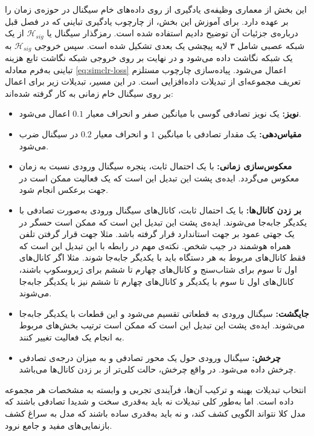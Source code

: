 این بخش از معماری وظیفه‌ی یادگیری از روی داده‌های خام سیگنال در حوزه‌ی زمان را بر عهده دارد. برای آموزش این بخش، از چارچوب یادگیری تباینی
که در فصل قبل درباره‌ی جزئیات آن توضیح دادیم استفاده شده است. رمزگذار سیگنال یا
$\mathcal{H}_{sig}$
از یک شبکه عصبی شامل ۳ لایه پیچشی یک بعدی تشکیل شده است. سپس خروجی $\mathcal{H}_{sig}$
به یک شبکه نگاشت داده می‌شود و در نهایت بر روی خروجی شبکه نگاشت تابع هزینه تباینی  به‌فرم معادله \ref{eq:simclr-loss}
اعمال می‌شود.
پیاده‌سازی چارچوب  مستلزم تعریف مجموعه‌ای از تبدیلات داده‌افزایی است. در این مسیر، تبدیلات زیر برای اعمال بر روی سیگنال خام زمانی به کار گرفته شده‌اند:
\begin{itemize}
    \item\textbf{نویز:} یک نویز تصادفی گوسی با میانگین صفر و انحراف معیار $0.1$ اعمال می‌شود.
    \item\textbf{مقیاس‌دهی:}
    یک مقدار تصادفی با میانگین $1$ و انحراف معیار $0.2$ در سیگنال ضرب می‌شود.
    \item\textbf{معکوس‌سازی زمانی:}
    با یک احتمال ثابت، پنجره سیگنال ورودی نسبت به زمان معکوس می‌گردد. ایده‌ی پشت این تبدیل این است که یک فعالیت ممکن است در جهت برعکس انجام شود.
    \item\textbf{بر زدن کانال‌ها:}
    با یک احتمال ثابت، کانال‌های سیگنال ورودی به‌صورت تصادفی با یکدیگر جابه‌جا می‌شوند. ایده‌ی پشت این تبدیل این است که ممکن است حسگر در یک جهتی عمود بر جهت استاندارد قرار گرفته باشد. مثلا جهت قرار گرفتن تلفن همراه هوشمند در جیب شخص. نکته‌ی مهم در رابطه با این تبدیل این است که فقط کانال‌های مربوط به هر دستگاه باید با یکدیگر جابه‌جا شوند. مثلا اگر کانال‌های اول تا سوم برای شتاب‌سنج و کانال‌های چهارم تا ششم برای ژیروسکوپ باشند، کانال‌های اول تا سوم با یکدیگر و کانال‌های چهارم تا ششم نیز با یکدیگر جابه‌جا می‌شوند.
    \item\textbf{جایگشت:} سیگنال ورودی به قطعاتی تقسیم می‌شود و این قطعات با یکدیگر جابه‌جا می‌شوند. ایده‌ی پشت این تبدیل این است که ممکن است ترتیب بخش‌های مربوط به انجام یک فعالیت تغییر کنند.
    \item\textbf{چرخش:}
    سیگنال ورودی حول یک محور تصادفی و به میزان درجه‌ی تصادفی چرخش داده می‌شود. در واقع چرخش، حالت کلی‌تر از بر زدن کانال‌ها می‌باشد.
\end{itemize}

انتخاب تبدیلات بهینه و ترکیب آن‌ها، فرآیندی تجربی و وابسته به مشخصات هر مجموعه داده است. اما به‌طور کلی تبدیلات نه باید به‌قدری سخت و شدیدا تصادفی باشند که مدل کلا نتواند الگویی کشف کند، و نه باید به‌قدری ساده باشند که مدل به سراغ کشف بازنمایی‌های مفید و جامع نرود.

